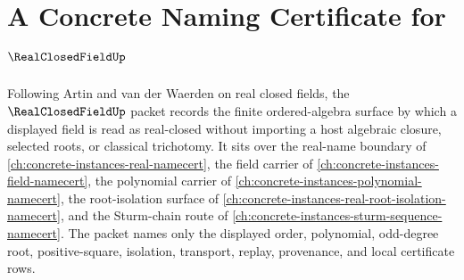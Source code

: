 \chapter{A Concrete Naming Certificate for $\RealClosedFieldUp$}
\label{ch:concrete-instances-real-closed-field-namecert}

Following Artin and van der Waerden on real closed fields, the $\RealClosedFieldUp$ packet records the finite ordered-algebra surface by which a displayed field is read as real-closed without importing a host algebraic closure, selected roots, or classical trichotomy. It sits over the real-name boundary of \autoref{ch:concrete-instances-real-namecert}, the field carrier of \autoref{ch:concrete-instances-field-namecert}, the polynomial carrier of \autoref{ch:concrete-instances-polynomial-namecert}, the root-isolation surface of \autoref{ch:concrete-instances-real-root-isolation-namecert}, and the Sturm-chain route of \autoref{ch:concrete-instances-sturm-sequence-namecert}. The packet names only the displayed order, polynomial, odd-degree root, positive-square, isolation, transport, replay, provenance, and local certificate rows.


